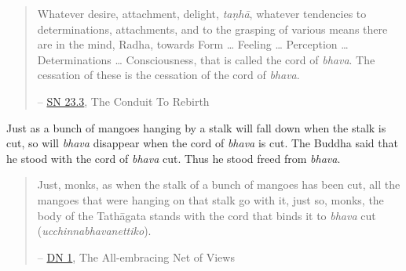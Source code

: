\begin{quote}
Whatever desire, attachment, delight, \emph{taṇhā}, whatever tendencies to determinations, attachments, and to the grasping of various means there are in the mind, Radha, towards Form \ldots{} Feeling \ldots{} Perception \ldots{} Determinations \ldots{} Consciousness, that is called the cord of \emph{bhava}. The cessation of these is the cessation of the cord of \emph{bhava}.

 -- \href{https://suttacentral.net/sn23.3/en/sujato}{SN 23.3}, The Conduit To Rebirth
\end{quote}

Just as a bunch of mangoes hanging by a stalk will fall down when the stalk is cut, so will \emph{bhava} disappear when the cord of \emph{bhava} is cut. The Buddha said that he stood with the cord of \emph{bhava} cut. Thus he stood freed from \emph{bhava}.

\begin{quote}
Just, monks, as when the stalk of a bunch of mangoes has been cut, all the mangoes that were hanging on that stalk go with it, just so, monks, the body of the Tathāgata stands with the cord that binds it to \emph{bhava} cut (\emph{ucchinnabhavanettiko}).

 -- \href{https://suttacentral.net/dn1/en/bodhi}{DN 1}, The All-embracing Net of Views
\end{quote}
